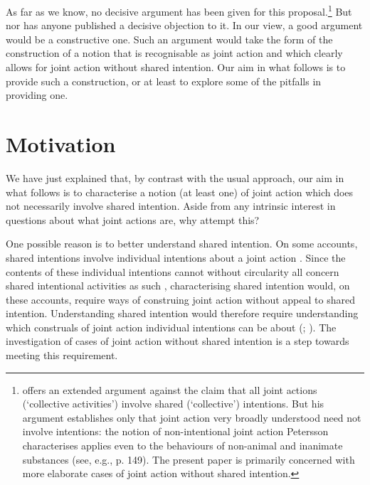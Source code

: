 \documentclass[12pt,a4paper]{extarticle}
\begin{document}
As far as we know, no decisive argument has been given for this proposal.\footnote{
\citet{petersson_collectivity_2007} offers an extended argument against the claim that all joint actions (`collective activities') involve shared (`collective') intentions.  But his argument establishes only that joint action very broadly understood need not involve intentions: the notion of non-intentional joint action Petersson characterises  applies even to the behaviours of non-animal and inanimate  substances (see, e.g., p. 149).  The present paper is primarily concerned with more elaborate cases of joint action without shared intention.
} 
But nor has anyone published a decisive objection to it.
In our view, a good argument would be a constructive one.
Such an argument would take the form of the construction of a notion that is recognisable as joint action and which clearly allows for joint action without shared intention.
Our aim in what follows is to provide such a construction, or at least to explore some of the pitfalls in providing one.

\section{Motivation
	\label{section_motivation}
}
We have just explained that, by contrast with the usual approach, our aim in what follows is to characterise a notion (at least one) of joint action which does not necessarily involve shared intention.
Aside from any intrinsic interest in questions about what joint actions are,
why attempt this?

One possible reason is to better understand shared intention.
On some accounts, shared intentions involve individual intentions about a joint action \citep[e.g.][]{Bratman:1993je}.  Since the contents of these individual intentions cannot without circularity all concern shared intentional activities as such \citep[p. 95]{Searle:1990em}, characterising shared intention would, on these accounts, require ways of construing joint action without appeal to shared intention.  Understanding shared intention would therefore require understanding which construals of joint action individual intentions can be about (\citealp{petersson_collectivity_2007}; \citealp[p. 163]{Bratman:2009lv}).  The investigation of cases of joint action without shared intention is a step towards meeting this requirement.
\end{document}
